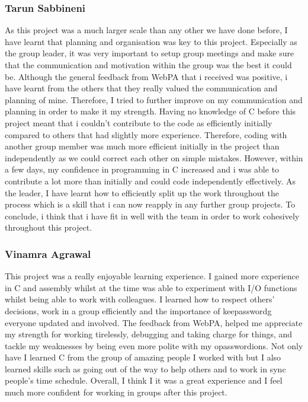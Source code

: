 \documentclass[11pt]{article}
\begin{document}
\subsubsection{Tarun Sabbineni}
As this project was a much larger scale than any other we have done before, I have learnt that planning and organisation was key to this project. Especially as the group leader, it was very important to setup group meetings and make sure that the communication and motivation within the group was the best it could be. Although the general feedback from WebPA that i received was positive, i have learnt from the others that they really valued the communication and planning of mine. Therefore, I tried to further improve on my communication and planning in order to make it my strength. Having no knowledge of C before this project meant that i couldn't contribute to the code as efficiently initially compared to others that had slightly more experience. Therefore, coding with another group member was much more efficient initially in the project than independently as we could correct each other on simple mistakes. However, within a few days, my confidence in programming in C increased and i was able to contribute a lot more than initially and could code independently effectively. As the leader, I have learnt how to efficiently split up the work throughout the process which is a skill that i can now reapply in any further group projects. To conclude, i think that i have fit in well with the team in order to work cohesively throughout this project. 

\subsubsection{Vinamra Agrawal}
This project was a really enjoyable learning experience. I gained more experience in C and assembly whilst at the time was able to experiment with I/O functions whilst being able to work with colleagues. I learned how to respect others' decisions, work in a group efficiently and the importance of keepasswordg everyone updated and involved. The feedback from WebPA, helped me appreciate my  strength for working tirelessly, debugging and taking charge for things, and tackle my weaknesses by being even more polite with my opasswordions. Not only have I learned C from the group of amazing people I worked with but I also learned skills such as going out of the way to help others and to work in sync people's time schedule.  Overall, I think I it was a great experience and I feel much more confident for working in groups after this project.
\end{document}
